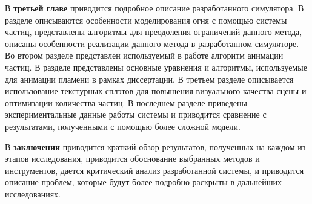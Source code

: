 В \textbf{третьей главе} приводится подробное описание разработанного
симулятора. В разделе описываются особенности моделирования огня с помощью
системы частиц, представлены алгоритмы для преодоления ограничений данного
метода, описаны особенности реализации данного метода в разработанном
симуляторе. Во втором разделе представлен используемый в работе алгоритм
анимации частиц. В разделе представлены основные уравнения и алгоритмы,
используемые для анимации пламени в рамках диссертации. В третьем разделе
описывается использование текстурных сплэтов для повышения визуального качества
сцены и оптимизации количества частиц. В последнем разделе приведены
экспериментальные данные работы системы и приводится сравнение с результатами,
полученными с помощью более сложной модели.

В \textbf{заключении} приводится краткий обзор результатов, полученных на каждом
из этапов исследования, приводится обоснование выбранных методов и инструментов,
дается критический анализ разработанной системы, и приводится описание проблем,
которые будут более подробно раскрыты в дальнейших исследованиях.
